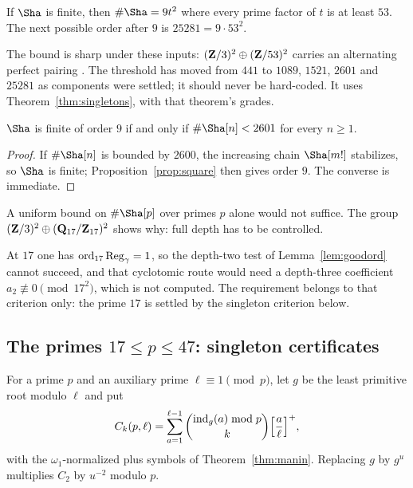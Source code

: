 \begin{proposition}\label{prop:square}
If $\Sha$ is finite, then $\#\Sha=9t^2$ where every prime factor of $t$ is at least $53$. The next possible order after $9$ is $25281=9\cdot53^2$.
\end{proposition}
The bound is sharp under these inputs: $(\mathbf{Z}/3)^2\oplus(\mathbf{Z}/53)^2$ carries an alternating perfect pairing \cite{poonenstoll}. The threshold has moved from $441$ to $1089$, $1521$, $2601$ and $25281$ as components were settled; it should never be hard-coded. It uses Theorem~\ref{thm:singletons}, with that theorem's grades.

\begin{proposition}\label{prop:uniform}
$\Sha$ is finite of order $9$ if and only if $\#\Sha[n]<2601$ for every $n\ge1$.
\end{proposition}
\begin{proof}
If $\#\Sha[n]$ is bounded by $2600$, the increasing chain $\Sha[m!]$ stabilizes, so $\Sha$ is finite; Proposition~\ref{prop:square} then gives order $9$. The converse is immediate.
\end{proof}
A uniform bound on $\#\Sha[p]$ over primes $p$ alone would not suffice. The group $(\mathbf{Z}/3)^2\oplus(\mathbf{Q}_{17}/\mathbf{Z}_{17})^2$ shows why: full depth has to be controlled.

\begin{remark}\label{rem:17}
At $17$ one has $\operatorname{ord}_{17}\operatorname{Reg}_\gamma=1$, so the depth-two test of Lemma~\ref{lem:goodord} cannot succeed, and that cyclotomic route would need a depth-three coefficient $a_2\not\equiv0\pmod{17^2}$, which is not computed. The requirement belongs to that criterion only: the prime $17$ is settled by the singleton criterion below.
\end{remark}

\subsection[The primes 17 to 47]{The primes $17\le p\le47$: singleton certificates}\label{subsec:singletons}
For a prime $p$ and an auxiliary prime $\ell\equiv1\pmod p$, let $g$ be the least primitive root modulo $\ell$ and put
\[
C_k(p,\ell)=\sum_{a=1}^{\ell-1}\binom{\operatorname{ind}_g(a)\bmod p}{k}\Bigl[\frac a\ell\Bigr]^+ ,
\]
with the $\omega_1$-normalized plus symbols of Theorem~\ref{thm:manin}. Replacing $g$ by $g^u$ multiplies $C_2$ by $u^{-2}$ modulo $p$.

